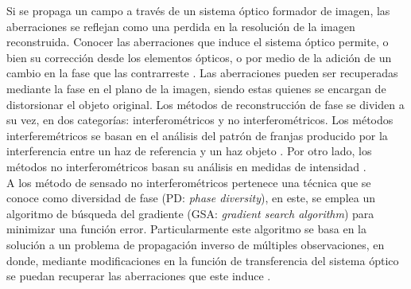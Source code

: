 Si se propaga un campo a través de un sistema óptico formador de imagen, las aberraciones se reflejan como una perdida en la resolución de la imagen reconstruida. Conocer las aberraciones que induce el sistema óptico permite, o bien su corrección desde los elementos ópticos, o por medio de la adición de un cambio en la fase que las contrarreste \cite{Liesener2004, Cizmar2011}. Las aberraciones pueden ser recuperadas mediante la fase en el plano de la imagen, siendo estas quienes se encargan de distorsionar el objeto original. Los métodos de reconstrucción de fase se dividen a su vez, en dos categorías: interferométricos y no interferométricos. Los métodos interferemétricos se basan en el análisis del patrón de franjas producido por la interferencia entre un haz de referencia y un haz objeto \cite{Creath1988, Malacara2007}. Por otro lado, los métodos no interferométricos basan su análisis en medidas de intensidad \cite{Soloviev2006, Chanan2000}.\\


A los método de sensado no interferométricos pertenece una técnica que se conoce como diversidad de fase (PD: \textit{phase diversity}), en este, se emplea un algoritmo de búsqueda del gradiente (GSA: \textit{gradient search algorithm}) para minimizar una función error. Particularmente este algoritmo se basa en la solución a un problema de propagación inverso de múltiples observaciones, en donde, mediante modificaciones en la función de transferencia del sistema óptico se puedan recuperar las aberraciones que este induce \cite{Gonsalves1982,Paxman1992}.\\

